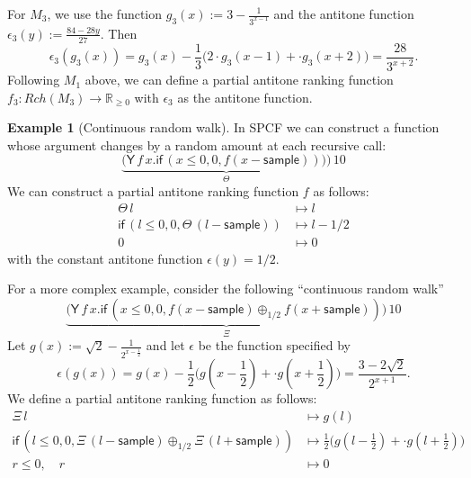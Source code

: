 \documentclass{article}
\newcommand{\nnReal}{\mathbb{R}_{{\geq}0}}
\newcommand{\tY}{\textsf{Y}}
\newcommand{\tif}[3]{\textsf{if}\,(#1, #2, #3)} %
\newcommand{\tsample}{\textsf{sample}}
\theoremstyle{definition}
\newtheorem{example}{Example}
\theoremstyle{lemma}
\theoremstyle{remark}
\begin{document}
For $M_3$, we use the function $g_3(x) := 3 - \frac{1}{3^{x-1}}$ and the antitone function $\epsilon_3(y) := \frac{84-28y}{27}$. 
Then
\[
\epsilon_3(g_3(x)) = g_3(x) - \dfrac{1}{3}\big(2 \cdot g_3(x-1) + \cdot g_3(x+2) \big) = 
\frac{28}{3^{x+2}}.
\]
Following $M_1$ above, we can define a partial antitone ranking function $f_3 : \mathit{Rch}(M_3) \to \nnReal$ with $\epsilon_3$ as the antitone function.

\begin{example}[Continuous random walk]\label{ex:raven complex}
In SPCF we can construct a function whose argument changes by a random amount at each recursive call:
\[
\underbrace{\big
(\tY \, f \, x . \tif{x \leq 0}{0}{f(x - \tsample))} \big)}_{\Theta} \, 10
\]
We can construct a partial antitone ranking function $f$ as follows:
\begin{align*}
\Theta \, l 
&\mapsto 
l
\\
\tif{l \leq 0}{0}{\Theta \, (l - \tsample)}
&\mapsto
l - 1/2
\\
0 &\mapsto 0
\end{align*}
with the constant antitone function $\epsilon(y) = 1/2$.

For a more complex example, consider the following ``continuous random walk''
\[
\underbrace{\big
(\tY \, f \, x . \tif{x \leq 0}{0}{f(x - \tsample) \oplus_{1/2} f(x + \tsample)} \big)}_{\Xi} \, 10
\]
Let $g(x) := \sqrt{2} - \frac{1}{2^{x-\frac{1}{2}}}$ and let $\epsilon$ be the function specified by
\[
\epsilon(g(x)) = g(x) - \dfrac{1}{2}\Big(g(x - \dfrac{1}{2}) + \cdot g(x + \dfrac{1}{2}) \Big) = 
\dfrac{3 - 2\sqrt{2}}{2^{x+1}}.
\]
We define a partial antitone ranking function as follows:
\begin{align*}
\Xi \, l 
&\mapsto 
g(l)
\\
\tif{l \leq 0}{0}{\Xi \, (l - \tsample) \oplus_{1/2} \Xi \, (l + \tsample)}
&\mapsto
\frac{1}{2}\big(g(l - \frac{1}{2}) + \cdot g(l + \frac{1}{2}) \big)
\\
r \leq 0, \quad r &\mapsto 0
\end{align*}
\end{example}
\end{document}
